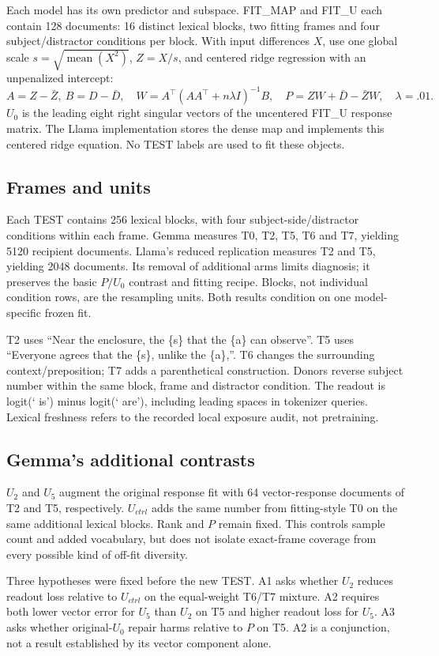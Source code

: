 Each model has its own predictor and subspace. FIT\_MAP and FIT\_U each contain 128 documents: 16 distinct lexical blocks, two fitting frames and four subject/distractor conditions per block. With input differences $X$, use one global scale $s=\sqrt{\operatorname{mean}(X^2)}$, $Z=X/s$, and centered ridge regression with an unpenalized intercept:
\[
 A=Z-\bar Z,\ B=D-\bar D,\quad W=A^\top(AA^\top+n\lambda I)^{-1}B,
 \quad P=ZW+\bar D-\bar ZW,\quad\lambda=.01.
\]
$U_0$ is the leading eight right singular vectors of the uncentered FIT\_U response matrix. The Llama implementation stores the dense map and implements this centered ridge equation. No TEST labels are used to fit these objects.

\subsection{Frames and units}
Each TEST contains 256 lexical blocks, with four subject-side/distractor conditions within each frame. Gemma measures T0, T2, T5, T6 and T7, yielding 5120 recipient documents. Llama's reduced replication measures T2 and T5, yielding 2048 documents. Its removal of additional arms limits diagnosis; it preserves the basic $P/U_0$ contrast and fitting recipe. Blocks, not individual condition rows, are the resampling units. Both results condition on one model-specific frozen fit.

T2 uses ``Near the enclosure, the \{s\} that the \{a\} can observe''. T5 uses ``Everyone agrees that the \{s\}, unlike the \{a\},''. T6 changes the surrounding context/preposition; T7 adds a parenthetical construction. Donors reverse subject number within the same block, frame and distractor condition. The readout is logit(` is') minus logit(` are'), including leading spaces in tokenizer queries. Lexical freshness refers to the recorded local exposure audit, not pretraining.

\subsection{Gemma's additional contrasts}
$U_2$ and $U_5$ augment the original response fit with 64 vector-response documents of T2 and T5, respectively. $U_{ctrl}$ adds the same number from fitting-style T0 on the same additional lexical blocks. Rank and $P$ remain fixed. This controls sample count and added vocabulary, but does not isolate exact-frame coverage from every possible kind of off-fit diversity.

Three hypotheses were fixed before the new TEST. A1 asks whether $U_2$ reduces readout loss relative to $U_{ctrl}$ on the equal-weight T6/T7 mixture. A2 requires both lower vector error for $U_5$ than $U_2$ on T5 and higher readout loss for $U_5$. A3 asks whether original-$U_0$ repair harms relative to $P$ on T5. A2 is a conjunction, not a result established by its vector component alone.

